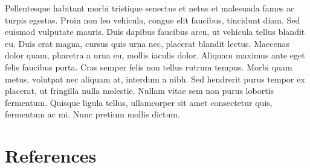\documentclass[stu,a4paper,12pt, nofontenc, babel, american]{apa7}
\begin{document}
Pellentesque habitant morbi tristique senectus et netus et malesuada
fames ac turpis egestas. Proin non leo vehicula, congue elit faucibus,
tincidunt diam. Sed euismod vulputate mauris. Duis dapibus faucibus
arcu, ut vehicula tellus blandit eu. Duis erat magna, cursus quis urna
nec, placerat blandit lectus. Maecenas dolor quam, pharetra a urna eu,
mollis iaculis dolor. Aliquam maximus ante eget felis faucibus porta.
Cras semper felis non tellus rutrum tempus. Morbi quam metus, volutpat
nec aliquam at, interdum a nibh. Sed hendrerit purus tempor ex placerat,
ut fringilla nulla molestie. Nullam vitae sem non purus lobortis
fermentum. Quisque ligula tellus, ullamcorper sit amet consectetur quis,
fermentum ac mi. Nunc pretium mollis dictum.

\newpage

\hypertarget{references}{%
\section*{References}\label{references}}
\end{document}

